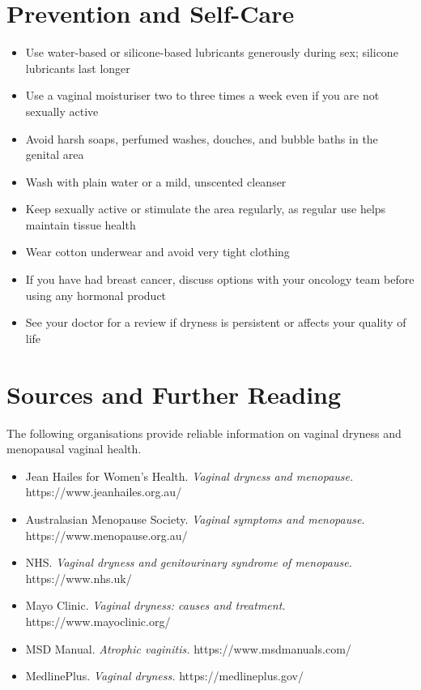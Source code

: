 \section*{Prevention and Self-Care}
\begin{itemize}
    \item Use water-based or silicone-based lubricants generously during sex; silicone lubricants last longer
    \item Use a vaginal moisturiser two to three times a week even if you are not sexually active
    \item Avoid harsh soaps, perfumed washes, douches, and bubble baths in the genital area
    \item Wash with plain water or a mild, unscented cleanser
    \item Keep sexually active or stimulate the area regularly, as regular use helps maintain tissue health
    \item Wear cotton underwear and avoid very tight clothing
    \item If you have had breast cancer, discuss options with your oncology team before using any hormonal product
    \item See your doctor for a review if dryness is persistent or affects your quality of life
\end{itemize}

\section*{Sources and Further Reading}
The following organisations provide reliable information on vaginal dryness and menopausal vaginal health.

\begin{itemize}
    \item Jean Hailes for Women's Health. \textit{Vaginal dryness and menopause.} https://www.jeanhailes.org.au/
    \item Australasian Menopause Society. \textit{Vaginal symptoms and menopause.} https://www.menopause.org.au/
    \item NHS. \textit{Vaginal dryness and genitourinary syndrome of menopause.} https://www.nhs.uk/
    \item Mayo Clinic. \textit{Vaginal dryness: causes and treatment.} https://www.mayoclinic.org/
    \item MSD Manual. \textit{Atrophic vaginitis.} https://www.msdmanuals.com/
    \item MedlinePlus. \textit{Vaginal dryness.} https://medlineplus.gov/
\end{itemize}
